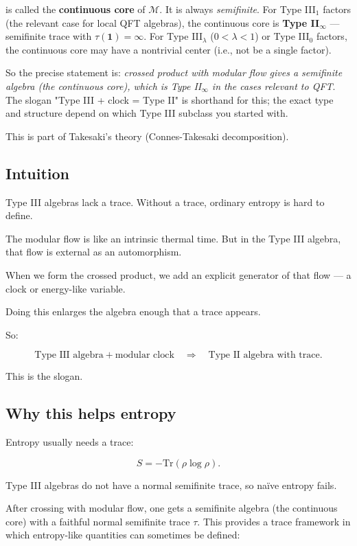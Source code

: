 \documentclass[11pt,a4paper]{article}
\begin{document}
is called the \textbf{continuous core} of $\mathcal{M}$. It is always \emph{semifinite}. For Type III$_1$ factors (the relevant case for local QFT algebras), the continuous core is \textbf{Type II$_\infty$} — semifinite trace with $\tau(\mathbf{1}) = \infty$. For Type III$_\lambda$ ($0 < \lambda < 1$) or Type III$_0$ factors, the continuous core may have a nontrivial center (i.e., not be a single factor).

So the precise statement is: \emph{crossed product with modular flow gives a semifinite algebra (the continuous core), which is Type II$_\infty$ in the cases relevant to QFT}. The slogan "Type III + clock = Type II" is shorthand for this; the exact type and structure depend on which Type III subclass you started with.

This is part of Takesaki's theory (Connes-Takesaki decomposition).

\subsection{Intuition}

Type III algebras lack a trace. Without a trace, ordinary entropy is hard to define.

The modular flow is like an intrinsic thermal time. But in the Type III algebra, that flow is external as an automorphism.

When we form the crossed product, we add an explicit generator of that flow — a clock or energy-like variable.

Doing this enlarges the algebra enough that a trace appears.

So:

\[
\text{Type III algebra}
+
\text{modular clock}
\quad
\Longrightarrow
\quad
\text{Type II algebra with trace}.
\]

This is the slogan.

\subsection{Why this helps entropy}

Entropy usually needs a trace:

\[
S=-\mathrm{Tr}(\rho\log\rho).
\]

Type III algebras do not have a normal semifinite trace, so naïve entropy fails.

After crossing with modular flow, one gets a semifinite algebra (the continuous core) with a faithful normal semifinite trace $\tau$. This provides a trace framework in which entropy-like quantities can sometimes be defined:
\end{document}
